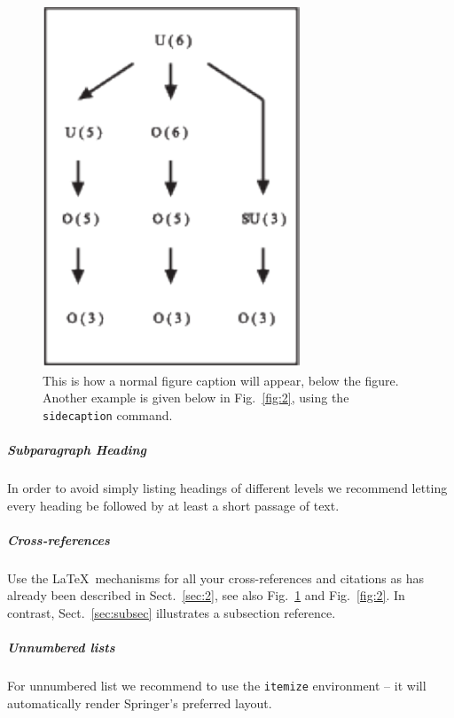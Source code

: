 \documentclass[graybox]{svmult}
\begin{document}
%
\begin{figure}[h]
\centerline{\includegraphics[scale=0.8]{figure}}
%
%
\caption{This is how a normal figure caption will appear, below the figure. Another
example is given below in Fig.~\ref{fig:2}, using the \texttt{sidecaption}
command. }
\label{fig:1}       %
\end{figure}

\subparagraph{Subparagraph Heading}
In order to avoid simply listing headings of different levels we recommend letting
every heading be followed by at least a short passage of text.


\subparagraph{Cross-references}
Use the \LaTeX\ mechanisms for all your cross-references and citations as has already
been described
in Sect.~\ref{sec:2}, see also Fig.~\ref{fig:1} and Fig.~\ref{fig:2}.
In contrast, Sect.~\ref{sec:subsec} illustrates a subsection reference.


\subparagraph{Unnumbered lists}
For unnumbered list we recommend to use the \verb|itemize| environment -- it will automatically render Springer's preferred layout.
\end{document}
